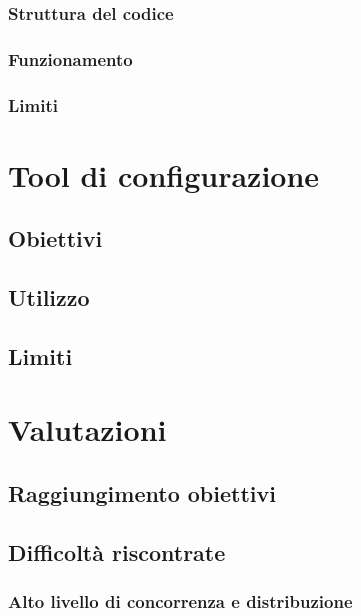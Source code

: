 \documentclass[a4paper]{article}
\begin{document}
\subsubsection{Struttura del codice}

\subsubsection{Funzionamento}

\subsubsection{Limiti}

\section{Tool di configurazione}
\subsection{Obiettivi}

\subsection{Utilizzo}

\subsection{Limiti}

\section{Valutazioni}
\subsection{Raggiungimento obiettivi}

\subsection{Difficoltà riscontrate}
\subsubsection{Alto livello di concorrenza e distribuzione}
\end{document}
